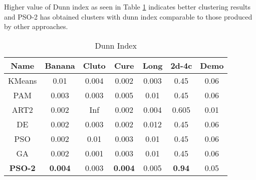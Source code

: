 \documentclass[conference]{IEEEtran}
\begin{document}
Higher value of Dunn index as seen in Table \ref{dunn} indicates better clustering results and PSO-2 has obtained clusters with dunn index comparable to those produced by other approaches.

\begin{table}[H]
\caption{Dunn Index}
\label{dunn}
\centering
\begin{tabular}{||c|c|c|c|c|c|c||}
  \hline
\multicolumn{1}{|c|}{\textbf{Name}} & \multicolumn{1}{c|}{\textbf{Banana}} & \multicolumn{1}{c|}{\textbf{Cluto}} & \multicolumn{1}{c|}{\textbf{Cure}} & \multicolumn{1}{c|}{\textbf{Long}} & \multicolumn{1}{c|}{\textbf{2d-4c}} & \multicolumn{1}{c|}{\textbf{Demo}}\\
  \hline\hline
  KMeans & 0.01 & 0.004 & 0.002 & 0.003 & 0.45 & 0.06  \\ [0.5ex]
   \hline
  PAM & 0.003 & 0.003 & 0.005 & 0.01 & 0.45 & 0.06 \\
   \hline
  ART2 & 0.002 & Inf & 0.002  & 0.004 & 0.605 & 0.01 \\
   \hline
  DE & 0.002 & 0.003 & 0.002 & 0.012 & 0.45 & 0.06 \\
   \hline
  PSO & 0.002 & 0.01 & 0.003 & 0.01 & 0.45 & 0.06 \\
   \hline
  GA & 0.002 & 0.001 & 0.003 & 0.01 & 0.45 & 0.06 \\
   \hline
  \textbf{PSO-2} & \textbf{0.004} & 0.003 & \textbf{0.004} &  0.005 &  \textbf{0.94} & 0.05 \\  [1ex]
  \hline
\end{tabular}
\end{table}
\end{document}
